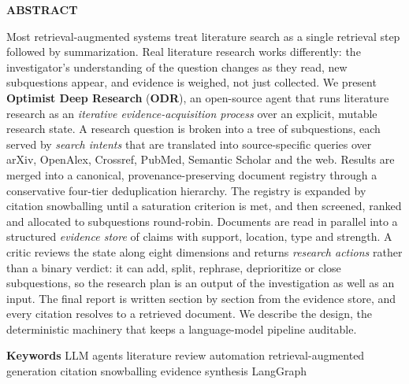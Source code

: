 \documentclass[10pt,a4paper]{article}
\newcommand{\hfont}{\sffamily}
\newcommand{\sys}{{\hfont\bfseries ODR}}
\newcommand{\sysfull}{{\hfont\bfseries Optimist Deep Research}}
\begin{document}
\begin{abstractbox}
{\hfont\footnotesize\bfseries\color{accent}ABSTRACT}\par\smallskip
Most retrieval-augmented systems treat literature search as a single retrieval step followed by summarization. Real literature research works differently: the investigator's understanding of the question changes as they read, new subquestions appear, and evidence is weighed, not just collected. We present \sysfull{} (\sys{}), an open-source agent that runs literature research as an \emph{iterative evidence-acquisition process} over an explicit, mutable research state. A research question is broken into a tree of subquestions, each served by \emph{search intents} that are translated into source-specific queries over arXiv, OpenAlex, Crossref, PubMed, Semantic Scholar and the web. Results are merged into a canonical, provenance-preserving document registry through a conservative four-tier deduplication hierarchy. The registry is expanded by citation snowballing until a saturation criterion is met, and then screened, ranked and allocated to subquestions round-robin. Documents are read in parallel into a structured \emph{evidence store} of claims with support, location, type and strength. A critic reviews the state along eight dimensions and returns \emph{research actions} rather than a binary verdict: it can add, split, rephrase, deprioritize or close subquestions, so the research plan is an output of the investigation as well as an input. The final report is written section by section from the evidence store, and every citation resolves to a retrieved document. We describe the design, the deterministic machinery that keeps a language-model pipeline auditable.
\end{abstractbox}

\vspace{0.3em}
{\hfont\footnotesize\color{muted}\textbf{\color{ink}Keywords}\hspace{0.8em}
LLM agents \textperiodcentered{} literature review automation \textperiodcentered{}
retrieval-augmented generation \textperiodcentered{} citation snowballing \textperiodcentered{}
evidence synthesis \textperiodcentered{} LangGraph}
\vspace{0.6em}

\end{document}
